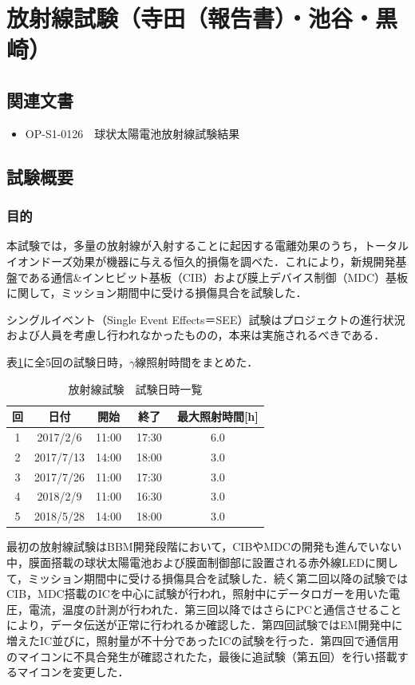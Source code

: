 \section{放射線試験（寺田（報告書）・池谷・黒崎）}
\subsection*{関連文書}
\begin{itemize}
	\item OP-S1-0126　球状太陽電池放射線試験結果
\end{itemize}
\subsection{試験概要}
\subsubsection{目的}
本試験では，多量の放射線が入射することに起因する電離効果のうち，トータルイオンドーズ効果が機器に与える恒久的損傷を調べた．これにより，新規開発基盤である通信\&インヒビット基板（CIB）および膜上デバイス制御（MDC）基板に関して，ミッション期間中に受ける損傷具合を試験した．

シングルイベント（Single Event Effects＝SEE）試験はプロジェクトの進行状況および人員を考慮し行われなかったものの，本来は実施されるべきである．


表\ref{table_4_date}に全5回の試験日時，$\gamma$線照射時間をまとめた．
\begin{table}[htbp]
	\centering
	\caption{放射線試験　試験日時一覧}
	\label{table_4_date}
	\begin{tabular}{ccccc}
		\hline\hline
		回& 日付 & 開始 & 終了　& 最大照射時間[h]  \\ \hline
		1&2017/2/6 &11:00  &17:30&6.0  \\
		2&2017/7/13  &14:00  &18:00&3.0  \\
		3&2017/7/26  &11:00  &17:30&3.0  \\
		4&2018/2/9  &11:00  &16:30&3.0 \\
		5&2018/5/28  &14:00  &18:00&3.0 \\\hline\hline
	\end{tabular}
\end{table}

最初の放射線試験はBBM開発段階において，CIBやMDCの開発も進んでいない中，膜面搭載の球状太陽電池および膜面制御部に設置される赤外線LEDに関して，ミッション期間中に受ける損傷具合を試験した．続く第二回以降の試験ではCIB，MDC搭載のICを中心に試験が行われ，照射中にデータロガーを用いた電圧，電流，温度の計測が行われた．第三回以降ではさらにPCと通信させることにより，データ伝送が正常に行われるか確認した．第四回試験ではEM開発中に増えたIC並びに，照射量が不十分であったICの試験を行った．第四回で通信用のマイコンに不具合発生が確認されたた，最後に追試験（第五回）を行い搭載するマイコンを変更した．

